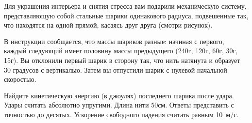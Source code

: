 
Для украшения интерьера и снятия стресса вам подарили механическую систему, 
представляющую собой стальные шарики одинакового радиуса, подвешенные так, что 
находятся на одной прямой, касаясь друг друга (смотри рисунок).


В инструкции сообщается, что массы шариков разные: начиная с первого, каждый следующий имеет 
половину массы предыдущего (240г, 120г, 60г, 30г, 15г). Вы отклонили первый шарик в сторону так, 
что нить натянута и образует 30 градусов с вертикалью. Затем вы отпустили шарик с 
нулевой начальной скоростью.

Найдите кинетическую энергию (в джоулях) последнего шарика после удара. Удары считать абсолютно упругими. Длина нити 50см. 
Ответы представить с точностью до десятых. Ускорение свободного падения считать равным 10~м/с.

